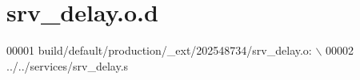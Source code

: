 \hypertarget{a00055_source}{\section{srv\+\_\+delay.\+o.\+d}
\label{a00055_source}
}

\begin{DoxyCode}
00001 build/\textcolor{keywordflow}{default}/production/\_ext/202548734/srv\_delay.o:  \(\backslash\)
00002  ../../services/srv\_delay.s 
\end{DoxyCode}
